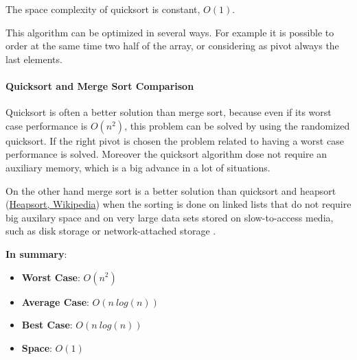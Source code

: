 The space complexity of quicksort is constant, \(O(1)\).

This algorithm can be optimized in several ways. For example it is possible to order at the same time two half of the array, or considering as pivot always the last elements.

\paragraph{Quicksort and Merge Sort Comparison}
Quicksort is often a better solution than merge sort, because even if its worst case performance is \(O(n^{2})\), this problem can be solved by using the randomized quicksort. If the right pivot is chosen the problem related to having a worst case performance is solved. Moreover the quicksort algorithm dose not require an auxiliary memory, which is a big advance in a lot of situations.

On the other hand merge sort is a better solution than quicksort and heapsort \cite{wikiheapsort} (\href{https://en.wikipedia.org/wiki/Heapsort}{Heapsort, Wikipedia}) when the sorting is done on linked lists that do not require big auxilary space and on very large data sets stored on slow-to-access media, such as disk storage or network-attached storage \cite{wikiqicksort}.

\textbf{In summary}:
\begin{itemize}
\item \textbf{Worst Case}: \(O(n^{2})\)
\item \textbf{Average Case}: \(O(n\ log(n))\)
\item \textbf{Best Case}: \(O(n\ log(n))\)
\item \textbf{Space}: \(O(1)\)
\end{itemize}

